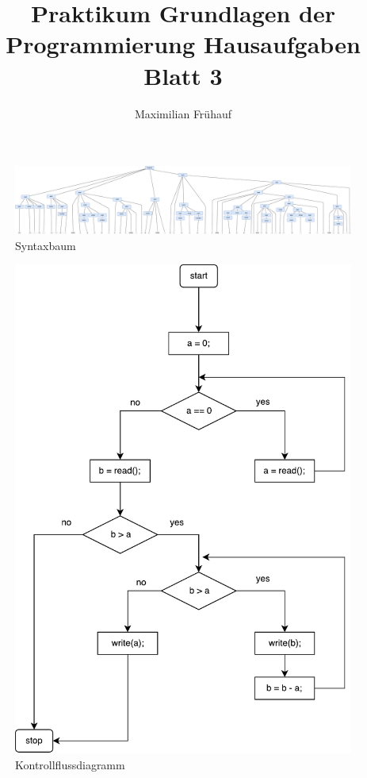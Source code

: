 \documentclass[a4paper, 10pt]{article}
\title{Praktikum Grundlagen der Programmierung Hausaufgaben Blatt 3}
\author{Maximilian Frühauf}
\begin{document}
\maketitle
\begin{figure}
	\centering
	\includegraphics[width=\textwidth, height=\textheight, keepaspectratio]{syntax}
	\caption{Syntaxbaum}
\end{figure}
\begin{figure}[htpb]
	\centering
	\includegraphics[width=\textwidth, height=\textheight, keepaspectratio]{kontrollfluss}
	\caption{Kontrollflussdiagramm}
\end{figure}
\end{document}
